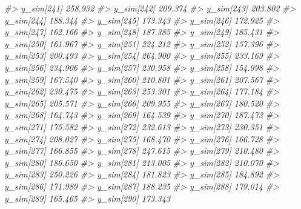 \documentclass[
  10pt,
  italian,
  a4paper,
  extrafontsizes,onecolumn,openright
  ]{memoir}
\newenvironment{Shaded}{\begin{snugshade}}{\end{snugshade}}
\newcommand{\CommentTok}[1]{\textcolor[rgb]{0.56,0.35,0.01}{\textit{#1}}}
\begin{document}
\begin{Shaded}
\begin{Highlighting}[]
\CommentTok{\#\textgreater{}   y\_sim[241] 258.932}
\CommentTok{\#\textgreater{}   y\_sim[242] 209.374}
\CommentTok{\#\textgreater{}   y\_sim[243] 203.802}
\CommentTok{\#\textgreater{}   y\_sim[244] 188.344}
\CommentTok{\#\textgreater{}   y\_sim[245] 173.343}
\CommentTok{\#\textgreater{}   y\_sim[246] 172.925}
\CommentTok{\#\textgreater{}   y\_sim[247] 162.166}
\CommentTok{\#\textgreater{}   y\_sim[248] 187.385}
\CommentTok{\#\textgreater{}   y\_sim[249] 185.431}
\CommentTok{\#\textgreater{}   y\_sim[250] 161.967}
\CommentTok{\#\textgreater{}   y\_sim[251] 224.212}
\CommentTok{\#\textgreater{}   y\_sim[252] 157.396}
\CommentTok{\#\textgreater{}   y\_sim[253] 200.493}
\CommentTok{\#\textgreater{}   y\_sim[254] 264.900}
\CommentTok{\#\textgreater{}   y\_sim[255] 233.169}
\CommentTok{\#\textgreater{}   y\_sim[256] 234.906}
\CommentTok{\#\textgreater{}   y\_sim[257] 230.958}
\CommentTok{\#\textgreater{}   y\_sim[258] 154.998}
\CommentTok{\#\textgreater{}   y\_sim[259] 167.540}
\CommentTok{\#\textgreater{}   y\_sim[260] 210.801}
\CommentTok{\#\textgreater{}   y\_sim[261] 207.567}
\CommentTok{\#\textgreater{}   y\_sim[262] 230.475}
\CommentTok{\#\textgreater{}   y\_sim[263] 253.301}
\CommentTok{\#\textgreater{}   y\_sim[264] 177.184}
\CommentTok{\#\textgreater{}   y\_sim[265] 205.571}
\CommentTok{\#\textgreater{}   y\_sim[266] 209.955}
\CommentTok{\#\textgreater{}   y\_sim[267] 180.520}
\CommentTok{\#\textgreater{}   y\_sim[268] 164.743}
\CommentTok{\#\textgreater{}   y\_sim[269] 164.539}
\CommentTok{\#\textgreater{}   y\_sim[270] 187.473}
\CommentTok{\#\textgreater{}   y\_sim[271] 175.582}
\CommentTok{\#\textgreater{}   y\_sim[272] 232.613}
\CommentTok{\#\textgreater{}   y\_sim[273] 230.351}
\CommentTok{\#\textgreater{}   y\_sim[274] 208.027}
\CommentTok{\#\textgreater{}   y\_sim[275] 168.470}
\CommentTok{\#\textgreater{}   y\_sim[276] 166.728}
\CommentTok{\#\textgreater{}   y\_sim[277] 166.855}
\CommentTok{\#\textgreater{}   y\_sim[278] 247.615}
\CommentTok{\#\textgreater{}   y\_sim[279] 210.480}
\CommentTok{\#\textgreater{}   y\_sim[280] 186.650}
\CommentTok{\#\textgreater{}   y\_sim[281] 213.005}
\CommentTok{\#\textgreater{}   y\_sim[282] 210.070}
\CommentTok{\#\textgreater{}   y\_sim[283] 250.226}
\CommentTok{\#\textgreater{}   y\_sim[284] 181.823}
\CommentTok{\#\textgreater{}   y\_sim[285] 184.892}
\CommentTok{\#\textgreater{}   y\_sim[286] 171.989}
\CommentTok{\#\textgreater{}   y\_sim[287] 188.235}
\CommentTok{\#\textgreater{}   y\_sim[288] 179.014}
\CommentTok{\#\textgreater{}   y\_sim[289] 165.465}
\CommentTok{\#\textgreater{}   y\_sim[290] 173.343}

\end{Highlighting}
\end{Shaded}
\end{document}
